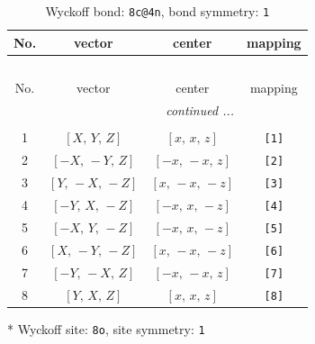 \documentclass[fleqn,8pt]{jsarticle}
\begin{document}
\renewcommand{\arraystretch}{1.2}
\begin{longtable}{cccc}
\caption{Wyckoff bond: {\tt 8c@4n}, bond symmetry: {\tt 1}}
 \\
 \hline \hline
No. & vector & center & mapping \\ \hline \endfirsthead

\multicolumn{3}{l}{\tablename\ \thetable{}} \\
 \hline \hline
No. & vector & center & mapping \\ \hline \endhead

 \hline \hline
\multicolumn{3}{r}{\footnotesize\it continued ...} \\ \endfoot

 \hline \hline
\multicolumn{3}{r}{} \\ \endlastfoot

1 & $\left[ X,\, Y,\, Z \right]$ & $\left[ x,\, x,\, z \right]$ & {\tt [1]} \\ \hline
2 & $\left[ - X,\, - Y,\, Z \right]$ & $\left[ - x,\, - x,\, z \right]$ & {\tt [2]} \\ \hline
3 & $\left[ Y,\, - X,\, - Z \right]$ & $\left[ x,\, - x,\, - z \right]$ & {\tt [3]} \\ \hline
4 & $\left[ - Y,\, X,\, - Z \right]$ & $\left[ - x,\, x,\, - z \right]$ & {\tt [4]} \\ \hline
5 & $\left[ - X,\, Y,\, - Z \right]$ & $\left[ - x,\, x,\, - z \right]$ & {\tt [5]} \\ \hline
6 & $\left[ X,\, - Y,\, - Z \right]$ & $\left[ x,\, - x,\, - z \right]$ & {\tt [6]} \\ \hline
7 & $\left[ - Y,\, - X,\, Z \right]$ & $\left[ - x,\, - x,\, z \right]$ & {\tt [7]} \\ \hline
8 & $\left[ Y,\, X,\, Z \right]$ & $\left[ x,\, x,\, z \right]$ & {\tt [8]} \\
\end{longtable}
* Wyckoff site: {\tt 8o}, site symmetry: {\tt 1}
\renewcommand{\arraystretch}{1.2}
\end{document}
